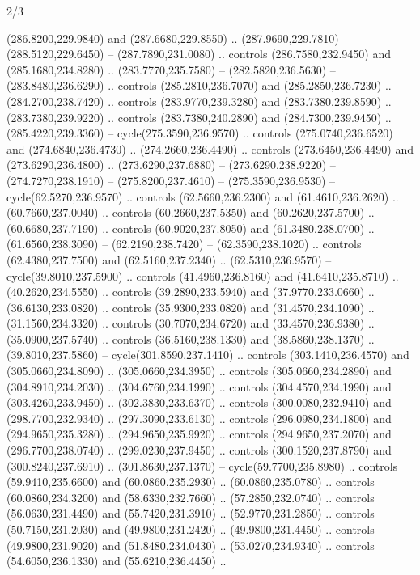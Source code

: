 \begin{flagdescription}{2/3}
\begin{scope}[xshift=0.5\flaglength,yshift=0.5\flagwidth,scale=\stretchfactor]
\begin{scope}[scale=0.001645\flagwidth,yshift=65mm,xshift=-63mm]
\begin{scope}[y=0.80pt, x=0.80pt, yscale=-1,]
\begin{scope}[cm={{1.33333,0.0,0.0,1.33333,(0.0,1e-05)}}]
  (286.8200,229.9840) and (287.6680,229.8550) .. (287.9690,229.7810) --
  (288.5120,229.6450) -- (287.7890,231.0080) .. controls (286.7580,232.9450) and
  (285.1680,234.8280) .. (283.7770,235.7580) -- (282.5820,236.5630) --
  (283.8480,236.6290) .. controls (285.2810,236.7070) and (285.2850,236.7230) ..
  (284.2700,238.7420) .. controls (283.9770,239.3280) and (283.7380,239.8590) ..
  (283.7380,239.9220) .. controls (283.7380,240.2890) and (284.7300,239.9450) ..
  (285.4220,239.3360) -- cycle(275.3590,236.9570) .. controls
  (275.0740,236.6520) and (274.6840,236.4730) .. (274.2660,236.4490) .. controls
  (273.6450,236.4490) and (273.6290,236.4800) .. (273.6290,237.6880) --
  (273.6290,238.9220) -- (274.7270,238.1910) -- (275.8200,237.4610) --
  (275.3590,236.9530) -- cycle(62.5270,236.9570) .. controls (62.5660,236.2300)
  and (61.4610,236.2620) .. (60.7660,237.0040) .. controls (60.2660,237.5350)
  and (60.2620,237.5700) .. (60.6680,237.7190) .. controls (60.9020,237.8050)
  and (61.3480,238.0700) .. (61.6560,238.3090) -- (62.2190,238.7420) --
  (62.3590,238.1020) .. controls (62.4380,237.7500) and (62.5160,237.2340) ..
  (62.5310,236.9570) -- cycle(39.8010,237.5900) .. controls (41.4960,236.8160)
  and (41.6410,235.8710) .. (40.2620,234.5550) .. controls (39.2890,233.5940)
  and (37.9770,233.0660) .. (36.6130,233.0820) .. controls (35.9300,233.0820)
  and (31.4570,234.1090) .. (31.1560,234.3320) .. controls (30.7070,234.6720)
  and (33.4570,236.9380) .. (35.0900,237.5740) .. controls (36.5160,238.1330)
  and (38.5860,238.1370) .. (39.8010,237.5860) -- cycle(301.8590,237.1410) ..
  controls (303.1410,236.4570) and (305.0660,234.8090) .. (305.0660,234.3950) ..
  controls (305.0660,234.2890) and (304.8910,234.2030) .. (304.6760,234.1990) ..
  controls (304.4570,234.1990) and (303.4260,233.9450) .. (302.3830,233.6370) ..
  controls (300.0080,232.9410) and (298.7700,232.9340) .. (297.3090,233.6130) ..
  controls (296.0980,234.1800) and (294.9650,235.3280) .. (294.9650,235.9920) ..
  controls (294.9650,237.2070) and (296.7700,238.0740) .. (299.0230,237.9450) ..
  controls (300.1520,237.8790) and (300.8240,237.6910) .. (301.8630,237.1370) --
  cycle(59.7700,235.8980) .. controls (59.9410,235.6600) and (60.0860,235.2930)
  .. (60.0860,235.0780) .. controls (60.0860,234.3200) and (58.6330,232.7660) ..
  (57.2850,232.0740) .. controls (56.0630,231.4490) and (55.7420,231.3910) ..
  (52.9770,231.2850) .. controls (50.7150,231.2030) and (49.9800,231.2420) ..
  (49.9800,231.4450) .. controls (49.9800,231.9020) and (51.8480,234.0430) ..
  (53.0270,234.9340) .. controls (54.6050,236.1330) and (55.6210,236.4450) ..

\end{scope}
\end{scope}
\end{scope}
\end{scope}
\end{flagdescription}
